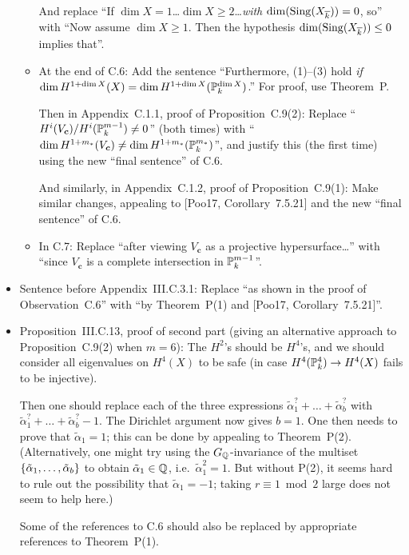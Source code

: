 \documentclass[12pt]{article}
\begin{document}
\begin{itemize}
\begin{itemize}
        And replace ``If $\dim{X}=1$\dots $\dim{X}\geq2$\dots \emph{with $\dim(\operatorname{Sing}(X_{\overline{k}}))=0$}, so''
        with ``Now assume $\dim{X}\geq 1$. Then the hypothesis $\dim(\operatorname{Sing}(X_{\overline{k}}))\leq 0$ implies that''.
        
        \item At the end of C.6:
        Add the sentence ``Furthermore, (1)--(3) hold \emph{if} $\dim H^{1+\dim{X}}(X) = \dim H^{1+\dim{X}}(\mathbb{P}^{\dim{X}}_k)$.''
        For proof, use Theorem~P.
        
        Then in Appendix~C.1.1, proof of Proposition~C.9(2):
        Replace ``$H^i(V_{\bm{c}})/H^i(\mathbb{P}^{m-1}_k)\neq0$'' (both times)
        with ``$\dim H^{1+m_\ast}(V_{\bm{c}})\neq \dim H^{1+m_\ast}(\mathbb{P}^{m_\ast}_k)$'',
        and justify this (the first time) using the new ``final sentence'' of C.6.
        
        And similarly, in Appendix~C.1.2, proof of Proposition~C.9(1):
        Make similar changes, appealing to [Poo17, Corollary~7.5.21] and the new ``final sentence'' of C.6.
        
        \item In C.7:
        Replace ``after viewing $V_{\bm{c}}$ as a projective hypersurface\dots'' with ``since $V_{\bm{c}}$ is a complete intersection in $\mathbb{P}^{m-1}_k$''.
    \end{itemize}
    
    \item Sentence before Appendix~III.C.3.1:
    Replace ``as shown in the proof of Observation~C.6''
    with ``by Theorem~P(1) and [Poo17, Corollary~7.5.21]''.
    
    \item Proposition~III.C.13, proof of second part (giving an alternative approach to Proposition~C.9(2) when $m=6$):
    The $H^2$'s should be $H^4$'s,
    and we should consider all eigenvalues on $H^4(X)$ to be safe (in case $H^4(\mathbb{P}^4_k)\to H^4(X)$ fails to be injective).
    
    Then one should replace each of the three expressions $\tilde{\alpha}_1^?+\dots+\tilde{\alpha}_b^?$ with $\tilde{\alpha}_1^?+\dots+\tilde{\alpha}_b^?-1$.
    The Dirichlet argument now gives $b=1$.
    One then needs to prove that $\tilde{\alpha}_1 = 1$;
    this can be done by appealing to Theorem~P(2).
    (Alternatively, one might try using the $G_{\mathbb{Q}}$-invariance of the multiset $\{\tilde{\alpha}_1,\dots,\tilde{\alpha}_b\}$ to obtain $\tilde{\alpha}_1\in \mathbb{Q}$, i.e.~$\tilde{\alpha}_1^2 = 1$.
    But without P(2), it seems hard to rule out the possibility that $\tilde{\alpha}_1 = -1$;
    taking $r\equiv 1\bmod{2}$ large does not seem to help here.)
    
    Some of the references to C.6 should also be replaced by appropriate references to Theorem~P(1).
\end{itemize}
\end{document}
